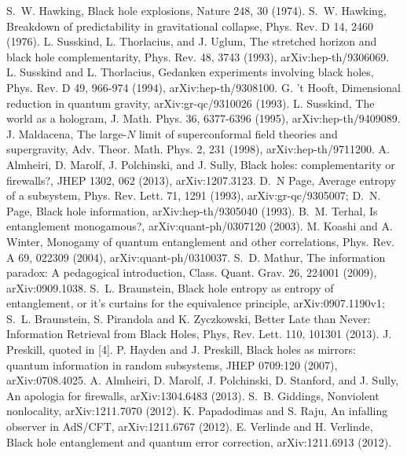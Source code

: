 \documentclass[11pt]{article}
\begin{document}
\begin{thebibliography}{99}

 S.~W. Hawking, Black hole explosions, Nature 248, 30 (1974).
 S.~W. Hawking, Breakdown of predictability in gravitational collapse, Phys. Rev. D 14, 2460 (1976).
 L. Susskind, L. Thorlacius, and J. Uglum, The stretched horizon and black hole complementarity, Phys. Rev. 48, 3743 (1993), arXiv:hep-th/9306069.
 L. Susskind and L. Thorlacius, Gedanken experiments involving black holes, Phys. Rev. D 49, 966-974 (1994), arXiv:hep-th/9308100.
 G. 't Hooft, Dimensional reduction in quantum gravity, arXiv:gr-qc/9310026 (1993).
 L. Susskind, The world as a hologram, J. Math. Phys. 36, 6377-6396 (1995), arXiv:hep-th/9409089.
 J. Maldacena, The large-$N$ limit of superconformal field theories and supergravity, Adv. Theor. Math. Phys. 2, 231 (1998), arXiv:hep-th/9711200.
 A. Almheiri, D. Marolf, J. Polchinski, and J. Sully, Black holes: complementarity or firewalls?, JHEP 1302, 062 (2013),  arXiv:1207.3123.
 D.~N Page, Average entropy of a subsystem, Phys. Rev. Lett. 71, 1291 (1993), arXiv:gr-qc/9305007; D.~N. Page, Black hole information, arXiv:hep-th/9305040 (1993).
 B.~M. Terhal, Is entanglement monogamous?, arXiv:quant-ph/0307120 (2003).
 M. Koashi and A. Winter, Monogamy of quantum entanglement and other correlations,  Phys. Rev. A 69, 022309 (2004), arXiv:quant-ph/0310037.
 S.~D. Mathur, The information paradox: A pedagogical introduction, Class. Quant. Grav. 26, 224001 (2009), arXiv:0909.1038.
 S.~L. Braunstein, Black hole entropy as entropy of entanglement, or
it's curtains for the equivalence principle, arXiv:0907.1190v1; S.~L. Braunstein, S. Pirandola and K. Zyczkowski, Better Late than Never: Information Retrieval from Black Holes,
Phys, Rev. Lett. 110, 101301 (2013).
 J. Preskill, quoted in [4].
 P. Hayden and J. Preskill, Black holes as mirrors: quantum information in random subsystems, JHEP 0709:120 (2007), arXiv:0708.4025.
 A. Almheiri, D. Marolf, J. Polchinski, D. Stanford, and J. Sully, An apologia for firewalls, arXiv:1304.6483 (2013).
 S.~B. Giddings, Nonviolent nonlocality, arXiv:1211.7070 (2012).
 K. Papadodimas and S. Raju, An infalling observer in AdS/CFT, arXiv:1211.6767 (2012).
 E. Verlinde and H. Verlinde, Black hole entanglement and quantum error correction, arXiv:1211.6913 (2012).

\end{thebibliography}
\end{document}
